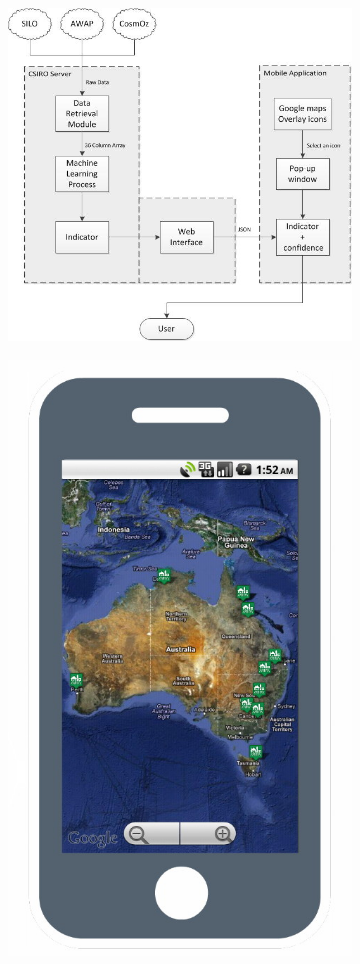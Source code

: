 \documentclass[12pt,journal,compsoc,onecolumn]{IEEEtran}
\begin{document}
\begin{figure}[H]
\centering
\begin{subfigure}{.7\textwidth}
  \centering
  \includegraphics[width=.8\linewidth]{Sch_system.jpg}
  \caption{}
  \label{fig:sub1}
\end{subfigure}%
\begin{subfigure}{.3\textwidth}
  \centering
  \includegraphics[width=.8\linewidth]{screenshot.jpg}

\end{subfigure}
\end{figure}
\end{document}
